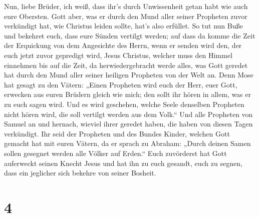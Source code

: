  Nun, liebe Brüder, ich weiß, dass ihr's durch
Unwissenheit getan habt wie auch eure Obersten.  Gott
aber, was er durch den Mund aller seiner Propheten zuvor verkündigt hat,
wie Christus leiden sollte, hat's also erfüllet.  So tut
nun Buße und bekehret euch, dass eure Sünden vertilgt werden;
 auf dass da komme die Zeit der Erquickung von dem
Angesichte des Herrn, wenn er senden wird den, der euch jetzt zuvor
gepredigt wird, Jesus Christus,  welcher muss den Himmel
einnehmen bis auf die Zeit, da herwiedergebracht werde alles, was Gott
geredet hat durch den Mund aller seiner heiligen Propheten von der Welt
an.  Denn Mose hat gesagt zu den Vätern: „Einen Propheten
wird euch der Herr, euer Gott, erwecken aus euren Brüdern gleich wie
mich; den sollt ihr hören in allem, was er zu euch sagen wird.
 Und es wird geschehen, welche Seele denselben Propheten
nicht hören wird, die soll vertilgt werden aus dem Volk.``
 Und alle Propheten von Samuel an und hernach, wieviel
ihrer geredet haben, die haben von diesen Tagen verkündigt.
 Ihr seid der Propheten und des Bundes Kinder, welchen
Gott gemacht hat mit euren Vätern, da er sprach zu Abraham: „Durch
deinen Samen sollen gesegnet werden alle Völker auf Erden.``
 Euch zuvörderst hat Gott auferweckt seinen Knecht Jesus
und hat ihn zu euch gesandt, euch zu segnen, dass ein jeglicher sich
bekehre von seiner Bosheit.

\hypertarget{section-3}{%
\section{4}\label{section-3}}

